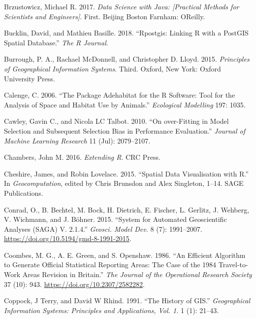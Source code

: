 \documentclass[]{krantz}
\begin{document}
\leavevmode\hypertarget{ref-brzustowicz_data_2017}{}%
Brzustowicz, Michael R. 2017. \emph{Data Science with Java: {[}Practical Methods for Scientists and Engineers{]}}. First. Beijing Boston Farnham: OReilly.

\leavevmode\hypertarget{ref-bucklin_rpostgis_2018}{}%
Bucklin, David, and Mathieu Basille. 2018. ``Rpostgis: Linking R with a PostGIS Spatial Database.'' \emph{The R Journal}.

\leavevmode\hypertarget{ref-burrough_principles_2015}{}%
Burrough, P. A., Rachael McDonnell, and Christopher D. Lloyd. 2015. \emph{Principles of Geographical Information Systems}. Third. Oxford, New York: Oxford University Press.

\leavevmode\hypertarget{ref-calenge_package_2006}{}%
Calenge, C. 2006. ``The Package Adehabitat for the R Software: Tool for the Analysis of Space and Habitat Use by Animals.'' \emph{Ecological Modelling} 197: 1035.

\leavevmode\hypertarget{ref-cawley_overfitting_2010}{}%
Cawley, Gavin C., and Nicola LC Talbot. 2010. ``On over-Fitting in Model Selection and Subsequent Selection Bias in Performance Evaluation.'' \emph{Journal of Machine Learning Research} 11 (Jul): 2079--2107.

\leavevmode\hypertarget{ref-chambers_extending_2016}{}%
Chambers, John M. 2016. \emph{Extending R}. CRC Press.

\leavevmode\hypertarget{ref-cheshire_spatial_2015}{}%
Cheshire, James, and Robin Lovelace. 2015. ``Spatial Data Visualisation with R.'' In \emph{Geocomputation}, edited by Chris Brunsdon and Alex Singleton, 1--14. SAGE Publications.

\leavevmode\hypertarget{ref-conrad_system_2015}{}%
Conrad, O., B. Bechtel, M. Bock, H. Dietrich, E. Fischer, L. Gerlitz, J. Wehberg, V. Wichmann, and J. Böhner. 2015. ``System for Automated Geoscientific Analyses (SAGA) V. 2.1.4.'' \emph{Geosci. Model Dev.} 8 (7): 1991--2007. \url{https://doi.org/10.5194/gmd-8-1991-2015}.

\leavevmode\hypertarget{ref-coombes_efficient_1986}{}%
Coombes, M. G., A. E. Green, and S. Openshaw. 1986. ``An Efficient Algorithm to Generate Official Statistical Reporting Areas: The Case of the 1984 Travel-to-Work Areas Revision in Britain.'' \emph{The Journal of the Operational Research Society} 37 (10): 943. \url{https://doi.org/10.2307/2582282}.

\leavevmode\hypertarget{ref-coppock_history_1991}{}%
Coppock, J Terry, and David W Rhind. 1991. ``The History of GIS.'' \emph{Geographical Information Systems: Principles and Applications, Vol. 1.} 1 (1): 21--43.
\end{document}
